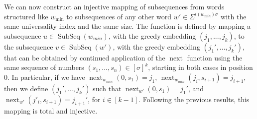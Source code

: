 \documentclass[10pt,a4paper]{amsart}
\DeclareMathOperator\ScatFact{SubSeq}
\DeclareMathOperator{\nextAlphPos}{next}
\theoremstyle{plain}
\theoremstyle{definition}
\begin{document}
We can now construct an injective mapping of subsequences from words structured like $w_{\min}$ to subsequences of any other word $w'\in\Sigma^{\iota(w_{min})\sigma}$ with the same universality index and the same size. The function is defined by mapping a subsequence $u\in\ScatFact(w_{min})$, with the greedy embedding $(j_1,...,j_{k})$, to the subsequence $v\in\ScatFact(w')$, with the greedy embedding $(j_1',...,j_{k}')$, that can be obtained by continued application of the $\nextAlphPos$ function using the same sequence of numbers $(s_1,...,s_n)\in[\sigma]^k$, starting in both cases in position $0$. In particular, if we have $\nextAlphPos_{w_{min}}(0,s_1) = j_1$, $\nextAlphPos_{w_{min}}(j_i,s_{i+1}) = j_{i+1}$, then we define $(j_1',...,j_{k}')$ such that $\nextAlphPos_{w'}(0,s_1) = j_1'$, and $\nextAlphPos_{w'}(j'_i,s_{i+1}) = j_{i+1}'$, for $i\in[k-1]$. Following the previous results, this mapping is total and injective.


\end{document}
